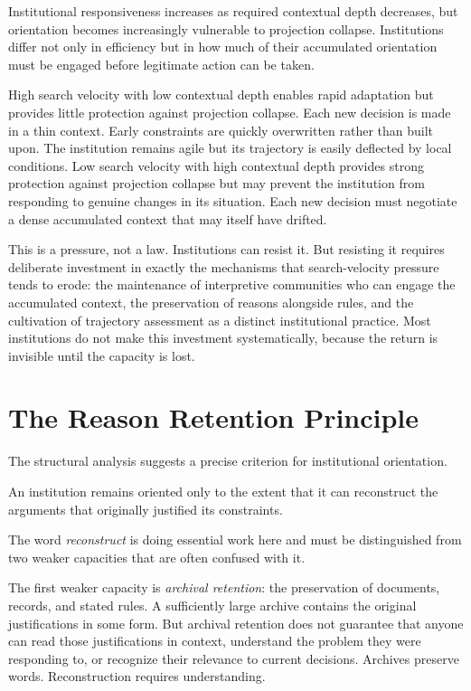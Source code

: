 \begin{principle}
Institutional responsiveness increases as required contextual depth decreases,
but orientation becomes increasingly vulnerable to projection collapse.
Institutions differ not only in efficiency but in how much of their accumulated
orientation must be engaged before legitimate action can be taken.
\end{principle}

High search velocity with low contextual depth enables rapid adaptation but
provides little protection against projection collapse. Each new decision is
made in a thin context. Early constraints are quickly overwritten rather than
built upon. The institution remains agile but its trajectory is easily deflected
by local conditions. Low search velocity with high contextual depth provides
strong protection against projection collapse but may prevent the institution
from responding to genuine changes in its situation. Each new decision must
negotiate a dense accumulated context that may itself have drifted.

This is a pressure, not a law. Institutions can resist it. But resisting it
requires deliberate investment in exactly the mechanisms that search-velocity
pressure tends to erode: the maintenance of interpretive communities who can
engage the accumulated context, the preservation of reasons alongside rules,
and the cultivation of trajectory assessment as a distinct institutional practice.
Most institutions do not make this investment systematically, because the
return is invisible until the capacity is lost.

\section{The Reason Retention Principle}

The structural analysis suggests a precise criterion for institutional
orientation.

\begin{principle}
An institution remains oriented only to the extent that it can reconstruct
the arguments that originally justified its constraints.
\end{principle}

The word \emph{reconstruct} is doing essential work here and must be
distinguished from two weaker capacities that are often confused with it.

The first weaker capacity is \emph{archival retention}: the preservation of
documents, records, and stated rules. A sufficiently large archive contains
the original justifications in some form. But archival retention does not
guarantee that anyone can read those justifications in context, understand
the problem they were responding to, or recognize their relevance to current
decisions. Archives preserve words. Reconstruction requires understanding.

